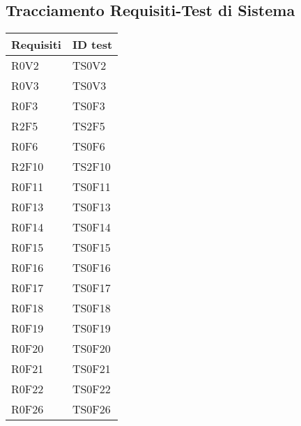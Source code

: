 \documentclass[../PianoDiQualifica.tex]{subfiles}
\begin{document}
	\newpage
	\subsection{Tracciamento Requisiti-Test di Sistema}
	\begin{longtable}[c] { >{\centering\arraybackslash}p{3cm} >{\centering\arraybackslash}p{3cm}}
		\toprule
		\centerline{\textbf{Requisiti}} & \centerline{\textbf{ID test}} \\
			\midrule
			R0V2 & TS0V2 \\
			\addlinespace[0.3em]
			\midrule
			\addlinespace[0.3em]
			R0V3 & TS0V3 \\
			\addlinespace[0.3em]
			\midrule
			\addlinespace[0.3em]
			R0F3 & TS0F3 \\
			\addlinespace[0.3em]
			\midrule
			\addlinespace[0.3em]
			R2F5 & TS2F5 \\ 
			\addlinespace[0.3em]
			\midrule
			\addlinespace[0.3em]
			R0F6 & TS0F6 \\ 
			\addlinespace[0.3em]
			\midrule
			\addlinespace[0.3em]
			R2F10 & TS2F10 \\ 
			\addlinespace[0.3em]
			\midrule
			\addlinespace[0.3em]
			R0F11 & TS0F11 \\ 
			\addlinespace[0.3em]
			\midrule
			\addlinespace[0.3em]
			R0F13 & TS0F13 \\ 
			\addlinespace[0.3em]
			\midrule
			\addlinespace[0.3em]
			R0F14 & TS0F14 \\ 
			\addlinespace[0.3em]
			\midrule
			\addlinespace[0.3em]
			R0F15 & TS0F15 \\ 
			\addlinespace[0.3em]
			\midrule
			\addlinespace[0.3em]
			R0F16 & TS0F16 \\
			\addlinespace[0.3em]
			\midrule
			\addlinespace[0.3em] 
			R0F17 & TS0F17 \\ 
			\addlinespace[0.3em]
			\midrule
			\addlinespace[0.3em]
			R0F18 & TS0F18 \\ 
			\addlinespace[0.3em]
			\midrule
			\addlinespace[0.3em]
			R0F19 & TS0F19 \\ 
			\addlinespace[0.3em]
			\midrule
			\addlinespace[0.3em]
			R0F20 & TS0F20 \\ 
			\addlinespace[0.3em]
			\midrule
			\addlinespace[0.3em]
			R0F21 & TS0F21 \\ 
			\addlinespace[0.3em]
			\midrule
			\addlinespace[0.3em]
			R0F22 & TS0F22 \\ 
			\addlinespace[0.3em]
			\midrule
			\addlinespace[0.3em]
			R0F26 & TS0F26 \\ 

\end{longtable}
\end{document}
